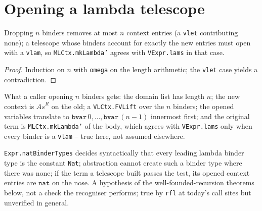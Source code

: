 \section{Opening a lambda telescope}

\begin{lemma}
\label{vpc:thm:mlctx-telescope-counting}
\leanok
{}

 Dropping $n$ binders removes at most $n$ context entries (a \texttt{vlet}
contributing none); a telescope whose binders account for exactly the new entries must open with
a \texttt{vlam}, so \texttt{MLCtx.mkLambda'} agrees with \texttt{VExpr.lams} in that case.
\end{lemma}
\begin{proof}\leanok
{} Induction on $n$ with \texttt{omega} on the length arithmetic; the \texttt{vlet} case
yields a contradiction.
\end{proof}

\begin{definition}
\label{vpc:struct:lambdatelescope-inv}\leanok
{}

 What a caller opening $n$ binders gets: the domain list has length $n$; the new
context is $\mathit{As}^{R}$ on the old; a \texttt{VLCtx.FVLift} over the $n$ binders; the opened
variables translate to $\mathtt{bvar}\,0,\dots,\mathtt{bvar}\,(n-1)$ innermost first; and the
original term is \texttt{MLCtx.mkLambda'} of the body, which agrees with \texttt{VExpr.lams} only
when every binder is a \texttt{vlam} -- true here, not assumed elsewhere.
\end{definition}

\begin{definition}
\label{vpc:def:natbindertypes}
\leanok
{}

 \texttt{Expr.natBinderTypes} decides syntactically that every leading lambda
binder type is the constant \texttt{Nat}; abstraction cannot create such a binder type where
there was none; if the term a telescope built passes the test, its opened context entries are
$\mathtt{nat}$ on the nose.
 A hypothesis of the well-founded-recursion theorems below, not a check the
recogniser performs; true by \texttt{rfl} at today's call sites but unverified in general.
\end{definition}

